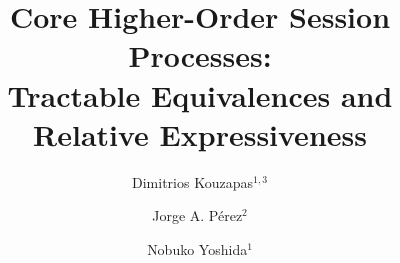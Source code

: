 \documentclass[runningheads,envcountsect,orivec]{llncs}
\begin{document}


\title {
	Core Higher-Order Session Processes: \\
	Tractable Equivalences and Relative Expressiveness
}\titlerunning{\today}\authorrunning{\today}
\author{
	Dimitrios Kouzapas${}^{1,3}$
        \and 
        Jorge A. P\'{e}rez${}^2$ 
	\and
	Nobuko Yoshida${}^1$
}
\maketitle


\iftodo

\else\fi





%




%








%




%

%

%






\appendix




%

%
%
%
\end{document}
